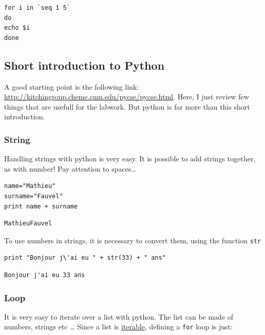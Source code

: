 \documentclass[a4paper,11pt,DIV=18]{scrartcl}
\begin{document}
\begin{verbatim}
for i in `seq 1 5`
do
echo $i
done
\end{verbatim}
\subsection{Short introduction to Python}
\label{sec:orgheadline29}
A     good    starting     point     is     the    following     link:
\url{http://kitchingroup.cheme.cmu.edu/pycse/pycse.html}.   Here,   I   just
review few things that are usefull  for the labwork. But python is far
more than this short introduction.
\subsubsection{String}
\label{sec:orgheadline52}
Handling  strings with  python is  very easy.  It is  possible to  add
strings together, as with number! Pay attention to spaces\ldots{}

\begin{verbatim}
name="Mathieu"
surname="Fauvel"
print name + surname
\end{verbatim}

\begin{verbatim}
MathieuFauvel
\end{verbatim}

To use numbers in strings, it is necessary to convert them, using the function \texttt{str}

\begin{verbatim}
print "Bonjour j\'ai eu " + str(33) + " ans"
\end{verbatim}

\begin{verbatim}
Bonjour j'ai eu 33 ans
\end{verbatim}

\subsubsection{Loop}
\label{sec:orgheadline53}
It is very  easy to iterate over  a list with python. The  list can be
made of numbers, strings etc \ldots{}  Since a list is \href{https://docs.python.org/2/glossary.html}{iterable}, defining a
\texttt{for} loop is just:
\end{document}
